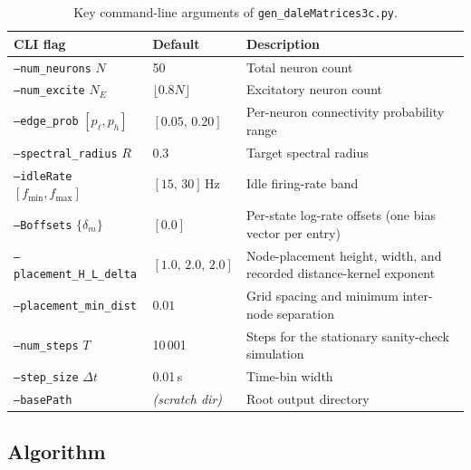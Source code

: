 \documentclass[11pt]{article}
\begin{document}
\begin{table}[htbp]
\centering
\begin{tabular}{lll}
\toprule
CLI flag & Default & Description \\
\midrule
\texttt{--num\_neurons} $N$ & 50 & Total neuron count \\
\texttt{--num\_excite} $N_E$ & $\lfloor 0.8N \rfloor$ &
  Excitatory neuron count \\
\texttt{--edge\_prob} $[p_\ell, p_h]$ & $[0.05,\, 0.20]$ &
  Per-neuron connectivity probability range \\
\texttt{--spectral\_radius} $R$ & 0.3 &
  Target spectral radius \\
\texttt{--idleRate} $[f_{\min}, f_{\max}]$ & $[15,\, 30]$\,Hz &
  Idle firing-rate band \\
\texttt{--Boffsets} $\{\delta_m\}$ & $[0.0]$ &
  Per-state log-rate offsets (one bias vector per entry) \\
\texttt{--placement\_H\_L\_delta} & $[1.0,\,2.0,\,2.0]$ &
  Node-placement height, width, and recorded distance-kernel exponent \\
\texttt{--placement\_min\_dist} & $0.01$ &
  Grid spacing and minimum inter-node separation \\
\texttt{--num\_steps} $T$ & 10\,001 &
  Steps for the stationary sanity-check simulation \\
\texttt{--step\_size} $\Delta t$ & 0.01\,s & Time-bin width \\
\texttt{--basePath} & \emph{(scratch dir)} &
  Root output directory \\
\bottomrule
\end{tabular}
\caption{Key command-line arguments of \texttt{gen\_daleMatrices3c.py}.}
\label{tab:dale_args}
\end{table}

\subsection{Algorithm}
\end{document}
